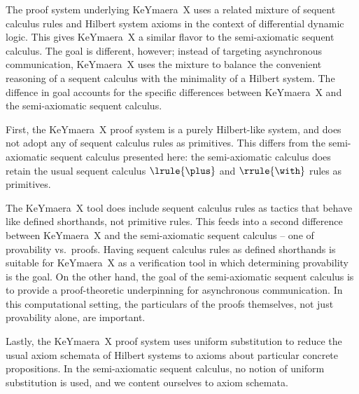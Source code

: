 The proof system underlying KeYmaera~X uses a related mixture of sequent calculus rules and Hilbert system axioms in the context of differential dynamic logic.\autocites{Platzer:JAR17}{Fulton+:CADE15}
This gives KeYmaera~X a similar flavor to the semi-axiomatic sequent calculus.
The goal is different, however; instead of targeting asynchronous communication, KeYmaera~X uses the mixture to balance the convenient reasoning of a sequent calculus with the minimality of a Hilbert system.
The diffence in goal accounts for the specific differences between KeYmaera~X and the semi-axiomatic sequent calculus. 

First, the KeYmaera~X proof system is a purely Hilbert-like system, and does not adopt any of sequent calculus rules as primitives.
This differs from the semi-axiomatic sequent calculus presented here: the semi-axiomatic calculus does retain the usual sequent calculus $\lrule{\plus}$ and $\rrule{\with}$ rules as primitives.

The KeYmaera~X tool does include sequent calculus rules as tactics that behave like defined shorthands, not primitive rules.
This feeds into a second difference between KeYmaera~X and the semi-axiomatic sequent calculus -- one of provability vs.\ proofs.
Having sequent calculus rules as defined shorthands is suitable for KeYmaera~X as a verification tool in which determining provability is the goal.
On the other hand, the goal of the semi-axiomatic sequent calculus is to provide a proof-theoretic underpinning for asynchronous communication.
In this computational setting, the particulars of the proofs themselves, not just provability alone, are important.

Lastly, the KeYmaera~X proof system uses uniform substitution to reduce the usual axiom schemata of Hilbert systems to axioms about particular concrete propositions.
In the semi-axiomatic sequent calculus, no notion of uniform substitution is used, and we content ourselves to axiom schemata.
  
